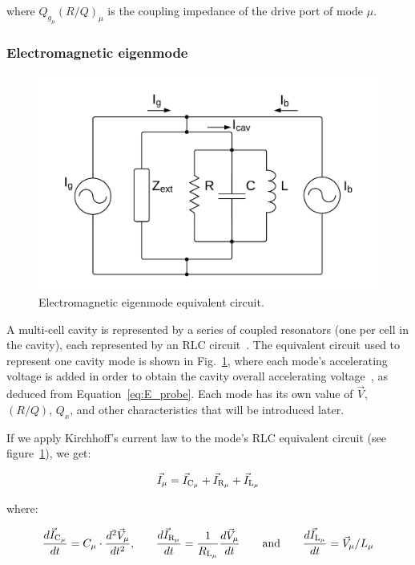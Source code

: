 \documentclass[a4paper,12pt]{article}
\begin{document}
\noindent where $Q_{g_{\mu}}(R/Q)_\mu$ is the coupling impedance of the drive port of mode $\mu$.

\subsubsection{Electromagnetic eigenmode}

\begin{figure}
\centering
\includegraphics[scale=0.20]{../figures/cavity_eq_circuit.png}
\caption{Electromagnetic eigenmode equivalent circuit.}
\label{fig:cav_eq_circuit}
\end{figure}

A multi-cell cavity is represented by a series of coupled resonators (one per cell in the cavity), each represented by an RLC circuit~\cite{ref:montgomery}. The equivalent circuit used to represent one cavity mode is shown in Fig.~\ref{fig:cav_eq_circuit}, where each mode's accelerating voltage is added in order to obtain the cavity overall accelerating voltage~\cite{ref:cell_modes}, as deduced from Equation~\ref{eq:E_probe}. Each mode has its own value of $\vec V$, $(R/Q)$, $Q_x$, and other characteristics that will be introduced later.

If we apply Kirchhoff's current law to the mode's RLC equivalent circuit (see figure~\ref{fig:cav_eq_circuit}), we get:

\begin{equation}
  \centering \vec I_{\mu} = \vec I_{\rm C_{\mu}} + \vec I_{\rm R_{\mu}} + \vec I_{\rm L_{\mu}}
  \label{eq:currents}
\end{equation}

\noindent where:

\begin{equation}
  \frac{d\vec I_{\rm C_{\mu}}}{dt} = C_{\mu} \cdot \frac{d^2\vec V_{\mu}}{dt^2}\text{,}\qquad \frac{d\vec I_{\rm R_{\mu}}}{dt} = \frac{1}{R_{\rm L_{\mu}}}\frac{d\vec V_{\mu}}{dt} \qquad \text{and}\qquad \frac{d\vec I_{\rm L_{\mu}}}{dt} = \vec V_{\mu}/L_{\mu}
  \label{eq:currents2}
\end{equation}
\end{document}
